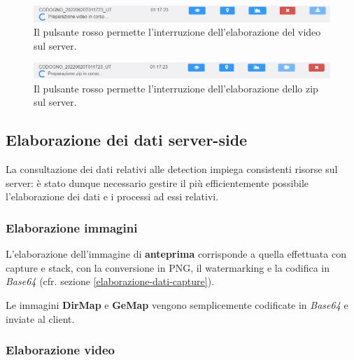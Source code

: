 \begin{figure}[H]
    \begin{center}
    \includegraphics[width=\textwidth]{images/stop-video.jpg}
    \caption{Il pulsante rosso permette l'interruzione dell'elaborazione del video sul server.}
    \label{stop-video}
    \end{center}
\end{figure}
\vspace{-24pt}
\begin{figure}[H]
    \begin{center}
    \includegraphics[width=\textwidth]{images/stop-zip.jpg}
    \caption{Il pulsante rosso permette l'interruzione dell'elaborazione dello zip sul server.}
    \label{stop-zip}
    \end{center}
\end{figure}

\subsection{Elaborazione dei dati server-side} \label{elaborazione-dati-detec}

La consultazione dei dati relativi alle detection impiega consistenti risorse sul server: è stato dunque necessario gestire il più efficientemente possibile l'elaborazione dei dati e i processi ad essi relativi.

\subsubsection{Elaborazione immagini}

L'elaborazione dell'immagine di \textbf{anteprima} corrisponde a quella effettuata con capture e stack, con la conversione in PNG, il watermarking e la codifica in \emph{Base64} (cfr. sezione \ref{elaborazione-dati-capture}).

Le immagini \textbf{DirMap} e \textbf{GeMap} vengono semplicemente codificate in \emph{Base64} e inviate al client.

\subsubsection{Elaborazione video}

